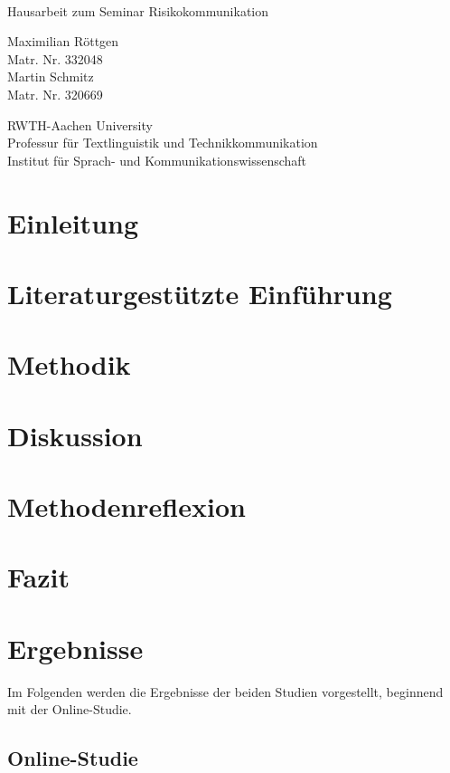 \documentclass[fontsize=13pt,a4paper]{article}
\begin{document}
\thispagestyle{empty}

{%
 \sffamily
 \centering
 \Large

 ~\vspace{\fill}

 {\huge
  Hausarbeit zum Seminar Risikokommunikation}

 \vspace{2.5cm}

 {\Large
  Maximilian Röttgen
 }\\
 Matr. Nr. 332048\\
 {\Large
  Martin Schmitz
}\\
Matr. Nr. 320669

 \vspace{3.5cm}

 RWTH-Aachen University\\
 Professur für Textlinguistik und Technikkommunikation\\
 Institut für Sprach- und Kommunikationswissenschaft

 \vspace{3.5cm}

\vspace{\fill}


}%
\clearpage
\sffamily

\tableofcontents
\clearpage

\section{Einleitung}
\section{Literaturgestützte Einführung}
\section{Methodik}
\section{Diskussion}
\section{Methodenreflexion}
\section{Fazit}


\section{Ergebnisse}
Im Folgenden werden die Ergebnisse der beiden Studien vorgestellt, beginnend mit der Online-Studie.
\subsection{Online-Studie}
\end{document}
